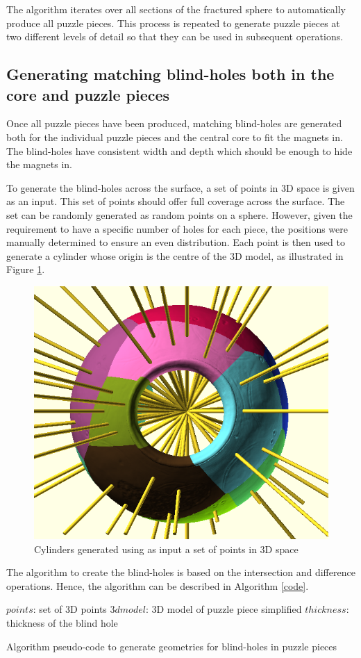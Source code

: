 \documentclass[acmlarge,screen]{acmart}
\begin{document}
The algorithm iterates over all sections of the fractured sphere to automatically produce all puzzle pieces. This process is repeated to generate puzzle pieces at two different levels of detail so that they can be used in subsequent operations.

\subsection{Generating matching blind-holes both in the core and puzzle pieces}
Once all puzzle pieces have been produced, matching blind-holes are generated both for the individual puzzle pieces and the central core to fit the magnets in. The blind-holes have consistent width and depth which should be enough to hide the magnets in. 

To generate the blind-holes across the surface, a set of points in 3D space is given as an input. This set of points should offer full coverage across the surface. The set can be randomly generated as random points on a sphere. However, given the requirement to have a specific number of holes for each piece, the positions were manually determined to ensure an even distribution. Each point is then used to generate a cylinder whose origin is the centre of the 3D model, as illustrated in Figure \ref{fig:cylinders}.

\begin{figure}[h]
  \centering
  \includegraphics[width=0.6\linewidth]{images/allcylinders.png}
  \caption{\label{fig:cylinders}
    Cylinders generated using as input a set of points in 3D space}
\end{figure}

The algorithm to create the blind-holes is based on the intersection and difference operations. Hence, the algorithm can be described in Algorithm \ref{code}.

\begin{algorithm}
   $points$: set of 3D points\;
   $3dmodel$: 3D model of puzzle piece simplified\;
   $thickness$: thickness of the blind hole\;
\caption{\label{code}Algorithm pseudo-code to generate geometries for blind-holes in puzzle pieces}
\end{algorithm}
\end{document}
